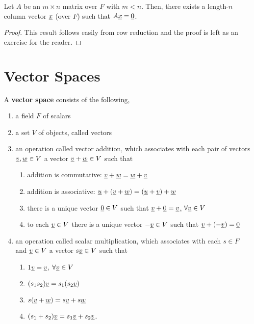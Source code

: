 \begin{lemma}
\label{lemma:widematrix_has_nullvector}
Let $A$ be an $m \times n$ matrix over $F$ with $m<n$.
Then, there exists a length-$n$ column vector $\underline{x}$ (over $F$) such that $A \underline{x} = \underline{0}$.
\end{lemma}
\begin{proof}
This result follows easily from row reduction and the proof is left as an exercise for the reader.
\end{proof}

\section{Vector Spaces}

\begin{definition} \label{definition:VectorSpace}
A \textbf{vector space} consists of the following,
\begin{enumerate}
\item a field $F$ of scalars
\item a set $V$ of objects, called vectors
\item an operation called vector addition, which associates with each pair of vectors $\underline{v}, \underline{w} \in V$ a vector $\underline{v} + \underline{w} \in V$ such that
\begin{enumerate}
\item addition is commutative: $\underline{v} + \underline{w} = \underline{w} + \underline{v}$
\item addition is associative: $\underline{u} + (\underline{v} + \underline{w}) = (\underline{u} + \underline{v}) + \underline{w}$
\item there is a unique vector $\underline{0} \in V$ such that $\underline{v} + \underline{0} = \underline{v}$, $\forall \underline{v} \in V$
\item to each $\underline{v} \in V$ there is a unique vector $- \underline{v} \in V$ such that $\underline{v} + (- \underline{v}) = \underline{0}$
\end{enumerate}
\item an operation called scalar multiplication, which associates with each $s \in F$ and $\underline{v} \in V$ a vector $s \underline{v} \in V$ such that
\begin{enumerate}
\item $1 \underline{v} = \underline{v}$, $\forall \underline{v} \in V$
\item $(s_1 s_2) \underline{v} = s_1 ( s_2 \underline{v} )$
\item $s ( \underline{v} + \underline{w} ) = s \underline{v} + s \underline{w}$
\item $(s_1 + s_2) \underline{v} = s_1 \underline{v} + s_2 \underline{v}$.
\end{enumerate}
\end{enumerate}
\end{definition}

